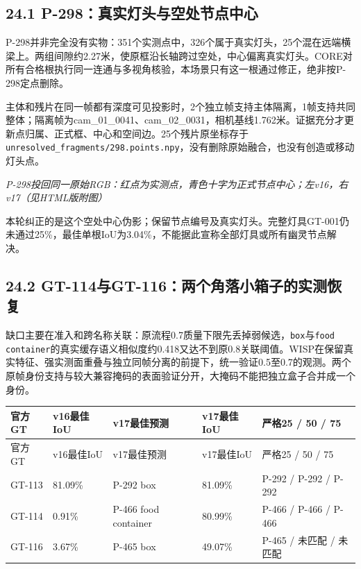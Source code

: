 \documentclass[UTF8,fontset=fandol]{ctexart}
\begin{document}
\subsection*{24.1 P-298：真实灯头与空处节点中心}

P-298并非完全没有实物：351个实测点中，326个属于真实灯头，25个混在远端横梁上。两组间隙约2.27米，使原框沿长轴跨过空处，中心偏离真实灯头。CORE对所有合格根执行同一连通与多视角核验，本场景只有这一根通过修正，绝非按P-298定点删除。



主体和残片在同一帧都有深度可见投影时，2个独立帧支持主体隔离，1帧支持共同整体；隔离帧为cam\_01\_0041、cam\_02\_0031，相机基线1.762米。证据充分才更新点归属、正式框、中心和空间边。25个残片原坐标存于\texttt{unresolved\_\allowbreak{}fragments/\allowbreak{}298.\allowbreak{}points.\allowbreak{}npy}，没有删除原始融合，也没有创造或移动灯头点。



\textit{P-298投回同一原始RGB：红点为实测点，青色十字为正式节点中心；左v16，右v17（见HTML版附图）}



本轮纠正的是这个空处中心伪影；保留节点编号及真实灯头。完整灯具GT-001仍未通过25\%，最佳单根IoU为3.04\%，不能据此宣称全部灯具或所有幽灵节点解决。



\subsection*{24.2 GT-114与GT-116：两个角落小箱子的实测恢复}

缺口主要在准入和跨名称关联：原流程0.7质量下限先丢掉弱候选，\texttt{box}与\texttt{food container}的真实缓存语义相似度约0.418又达不到原0.8关联阈值。WISP在保留真实特征、强实测面重叠与独立同帧分离的前提下，统一验证0.5至0.7的观测。两个原帧身份支持与较大兼容掩码的表面验证分开，大掩码不能把独立盒子合并成一个身份。



{\small
\begin{longtable}{|p{}|p{}|p{}|p{}|p{}|}
\hline
官方GT & v16最佳IoU & v17最佳预测 & v17最佳IoU & 严格25 / 50 / 75 \\ \hline
\endfirsthead
\hline
官方GT & v16最佳IoU & v17最佳预测 & v17最佳IoU & 严格25 / 50 / 75 \\ \hline
\endhead
GT-113 & 81.09\% & P-292 box & 81.09\% & P-292 / P-292 / P-292 \\ \hline
GT-114 & 0.91\% & P-466 food container & 80.99\% & P-466 / P-466 / P-466 \\ \hline
GT-116 & 3.67\% & P-465 box & 49.07\% & P-465 / 未匹配 / 未匹配 \\ \hline
\end{longtable}
}
\end{document}
